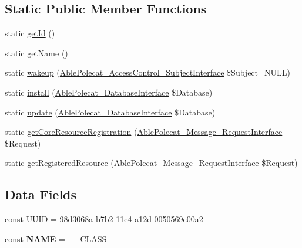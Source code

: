 \subsection*{Static Public Member Functions}
\begin{DoxyCompactItemize}
\item 
static \hyperlink{class_able_polecat___registry___resource_acfaa3a96d0cb5a4c0d4d710dcba41e9e}{get\+Id} ()
\item 
static \hyperlink{class_able_polecat___registry___resource_a4ef9bd37ba3ce8a13c1e8bcf4f72a630}{get\+Name} ()
\item 
static \hyperlink{class_able_polecat___registry___resource_a3f2135f6ad45f51d075657f6d20db2cd}{wakeup} (\hyperlink{interface_able_polecat___access_control___subject_interface}{Able\+Polecat\+\_\+\+Access\+Control\+\_\+\+Subject\+Interface} \$Subject=N\+U\+L\+L)
\item 
static \hyperlink{class_able_polecat___registry___resource_a97e9bacf538c072e0542eeb96d2475af}{install} (\hyperlink{interface_able_polecat___database_interface}{Able\+Polecat\+\_\+\+Database\+Interface} \$Database)
\item 
static \hyperlink{class_able_polecat___registry___resource_a8398510e79e9787266fe116d6431948c}{update} (\hyperlink{interface_able_polecat___database_interface}{Able\+Polecat\+\_\+\+Database\+Interface} \$Database)
\item 
static \hyperlink{class_able_polecat___registry___resource_a0ecbd743e77227ea6000faf76bb30d02}{get\+Core\+Resource\+Registration} (\hyperlink{interface_able_polecat___message___request_interface}{Able\+Polecat\+\_\+\+Message\+\_\+\+Request\+Interface} \$Request)
\item 
static \hyperlink{class_able_polecat___registry___resource_aaee10d6aa95192fbb916de38a202d913}{get\+Registered\+Resource} (\hyperlink{interface_able_polecat___message___request_interface}{Able\+Polecat\+\_\+\+Message\+\_\+\+Request\+Interface} \$Request)
\end{DoxyCompactItemize}
\subsection*{Data Fields}
\begin{DoxyCompactItemize}
\item 
const \hyperlink{class_able_polecat___registry___resource_a74b892c8c0b86bf9d04c5819898c51e7}{U\+U\+I\+D} = \textquotesingle{}98d3068a-\/b7b2-\/11e4-\/a12d-\/0050569e00a2\textquotesingle{}
\item 
\hypertarget{class_able_polecat___registry___resource_a244352f035b82b20b0efa506167fd862}{}const {\bfseries N\+A\+M\+E} = \+\_\+\+\_\+\+C\+L\+A\+S\+S\+\_\+\+\_\+\label{class_able_polecat___registry___resource_a244352f035b82b20b0efa506167fd862}

\end{DoxyCompactItemize}
